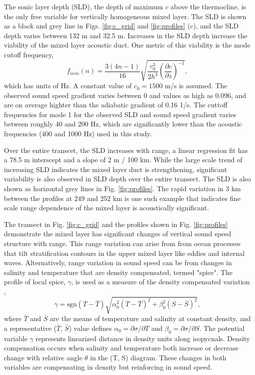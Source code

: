 \documentclass[preprint,NumberedRefs]{JASA}
\begin{document}
The sonic layer depth (SLD), the depth of maximum $c$ above the thermocline, is the only free variable for vertically homogeneous mixed layer. The SLD is shown as a black and grey line in Figs. \ref{fig:c_grid} and \ref{fig:profiles} (c), and the SLD depth varies between 132 m and 32.5 m. Increases in the SLD depth increase the viability of the mixed layer acoustic duct. One metric of this viability is the mode cutoff frequency,
\begin{equation}
    f_{min}(n) = \frac{3(4n-1)}{16} \sqrt{\frac{c_0^3}{2h^3} \left( \frac{\partial c}{\partial z} \right) ^ {-1}},
    \label{eq:f_cutoff}
\end{equation}
which has units of Hz. A constant value of $c_0 = 1500$ m/s is assumed. The observed sound speed gradient varies between 0 and values as high as 0.096, and are on average highter than the adiabatic gradient of 0.16 1/s\cite{colosi2020observations}. The cuttoff frequencies for mode 1 for the observed SLD and sound speed gradient varies between roughly 40 and 200 Hz, which are significantly lower than the acoustic frequencies (400 and 1000 Hz) used in this study.

Over the entire transcet, the SLD increases with range, a linear regression fit has a 78.5 m interscept and a slope of 2 m / 100 km. While the large scale trend of increasing SLD indicates the mixed layer duct is strengthening, significant variability is also observed in SLD depth over the entire transect. The SLD is also shown as horizontal grey lines in Fig. \ref{fig:profiles}. The rapid variation in 3 km between the profiles at 249 and 252 km is one such example that indicates fine scale range dependence of the mixed layer is acoustically significant.

The transect in Fig. \ref{fig:c_grid} and the profiles shown in Fig. \ref{fig:profiles} demonstrate the mixed layer has significant changes of vertical sound speed structure with range. This range variation can arise from from ocean processes that tilt stratification contours in the upper mixed layer like eddies and internal waves. Alternatively, range variation in sound speed can be from changes in salinity and temperature that are density compensated, termed "spice". The profile of local spice, $\gamma$, is used as a measure of the density compensated variation \citep{klymak2015spice},
\begin{equation}
    \gamma=\textrm{sgn}(T-\bar{T}) \sqrt{\alpha_0^2(T-\bar{T})^2 +\beta_0^2(S-\bar{S})^2},
    \label{eq:gamma}
\end{equation}
where $\bar{T}$ and $\bar{S}$ are the means of temperature and salinity at constant density, and a representative ($\bar{T}$, $\bar{S}$) value defines $\alpha_0=\partial \sigma / \partial T$ and $\beta_0=\partial \sigma / \partial S$. The potential variable $\gamma$ represents linearized distance in density units along isopycnals. Density compensation occurs when salinity and temperature both increase or decrease change with relative angle $\theta$ in the (T, S) diagram. These changes in both variables are compensating in density but reinforcing in sound speed.
\end{document}
